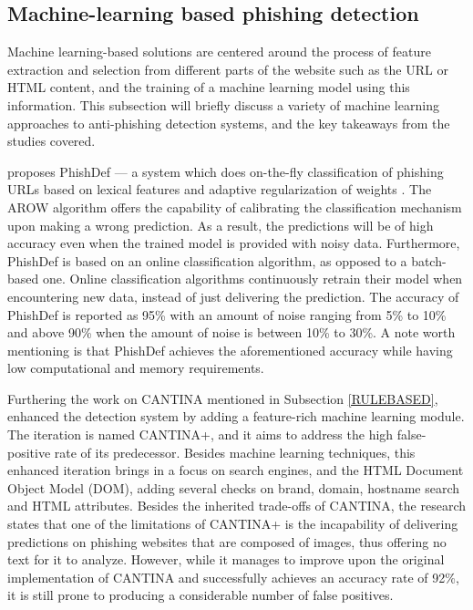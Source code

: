 \subsection{Machine-learning based phishing detection}

Machine learning-based solutions are centered around the process of feature extraction and selection from different parts of the website such as the URL or HTML content, and the training of a machine learning model using this information. This subsection will briefly discuss a variety of machine learning approaches to anti-phishing detection systems, and the key takeaways from the studies covered.

\cite{URL_SAYS_ALL} proposes PhishDef --- a system which does on-the-fly classification of phishing URLs based on lexical features and adaptive regularization of weights \citep{AROW}. The AROW algorithm offers the capability of calibrating the classification mechanism upon making a wrong prediction. As a result, the predictions will be of high accuracy even when the trained model is provided with noisy data. Furthermore, PhishDef is based on an online classification algorithm, as opposed to a batch-based one. Online classification algorithms continuously retrain their model when encountering new data, instead of just delivering the prediction. The accuracy of PhishDef is reported as 95\% with an amount of noise ranging from 5\% to 10\% and above 90\% when the amount of noise is between 10\% to 30\%. A note worth mentioning is that PhishDef achieves the aforementioned accuracy while having low computational and memory requirements.

Furthering the work on CANTINA mentioned in Subsection \ref{RULEBASED}, \cite{CANTINA+} enhanced the detection system by adding a feature-rich machine learning module. The iteration is named CANTINA+, and it aims to address the high false-positive rate of its predecessor. Besides machine learning techniques, this enhanced iteration brings in a focus on search engines, and the HTML Document Object Model (DOM), adding several checks on brand, domain, hostname search and HTML attributes. Besides the inherited trade-offs of CANTINA, the research states that one of the limitations of CANTINA+ is the incapability of delivering predictions on phishing websites that are composed of images, thus offering no text for it to analyze. However, while it manages to improve upon the original implementation of CANTINA and successfully achieves an accuracy rate of 92\%, it is still prone to producing a considerable number of false positives.

